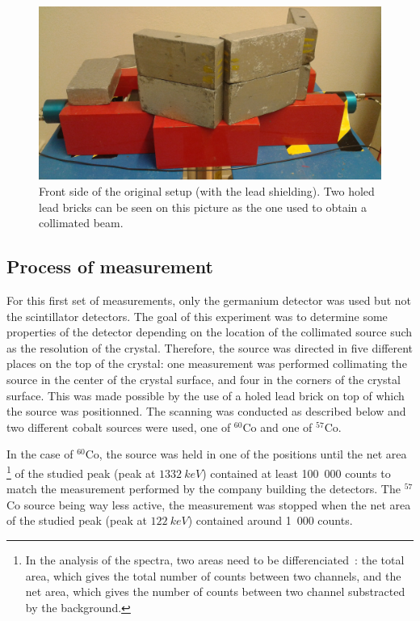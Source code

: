 \documentclass[11pt,a4paper]{article}
\begin{document}
\begin{figure}[!h]
\centering
\includegraphics[scale=0.15]{New_setup_front.jpg}
\caption{Front side of the original setup (with the lead shielding). Two holed lead bricks can be seen on this picture as the one used to obtain a collimated beam.}
\label{Setup_front}
\end{figure}

\subsection{Process of measurement} \label{protocol}

For this first set of measurements, only the germanium detector was used but not the scintillator detectors. The goal of this experiment was to determine some properties of the detector depending on the location of the collimated source such as the resolution of the crystal. Therefore, the source was directed in five different places on the top of the crystal: one measurement was performed collimating the source in the center of the crystal surface, and four in the corners of the crystal surface. This was made possible by the use of a holed lead brick on top of which the source was positionned. The scanning was conducted as described below and two different cobalt sources were used, one of $^{60}$Co and one of $^{57}$Co.

In the case of $^{60}$Co, the source was held in one of the positions until the net area \footnote{In the analysis of the spectra, two areas need to be differenciated~: the total area, which gives the total number of counts between two channels, and the net area, which gives the number of counts between two channel substracted by the background.} of the studied peak (peak at $1332~keV$) contained at least 100~000 counts to match the measurement performed by the company building the detectors. The $^{57}$Co source being way less active, the measurement was stopped when the net area of the studied peak (peak at $122~keV$) contained around 1~000 counts.
\end{document}

